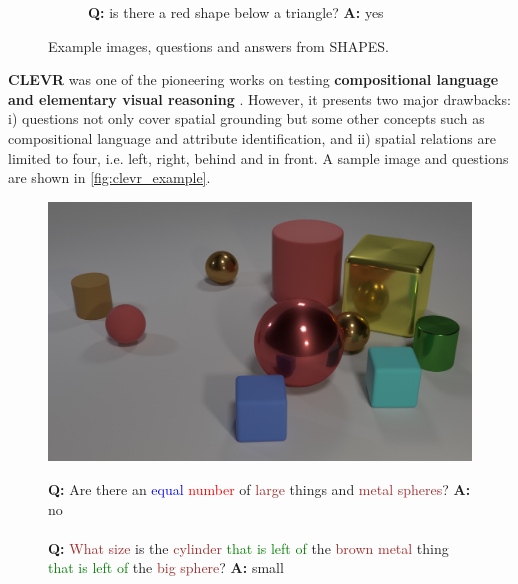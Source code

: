 \begin{figure}[ht]
\begin{subfigure}[b]{0.24\linewidth}
    \caption{\textbf{Q:} is there a red shape below a triangle? \textbf{A:} yes}
     \end{subfigure}
    \caption{Example images, questions and answers from SHAPES.}
    \label{fig:shapes_examples}
\end{figure}

\textbf{CLEVR} was one of the pioneering works on testing \textbf{compositional language and elementary visual reasoning} \cite{johnson2017clevr}. However, it presents two major drawbacks: i) questions not only cover spatial grounding but some other concepts such as compositional language and attribute identification, and ii) spatial relations are limited to four, i.e. left, right, behind and in front. A sample image and questions are shown in \cref{fig:clevr_example}.

\begin{figure}[ht]
  \centering
  \begin{minipage}{0.49\textwidth}
  \includegraphics[width=\textwidth]{images/datasets/clevr_example.jpg}
  \end{minipage}
  \vspace{1mm}
  \begin{minipage}{0.49\textwidth}
    \footnotesize
    \textbf{Q:} Are there an \textcolor{blue}{equal} \textcolor{red}{number} of
    \textcolor{brown}{large} things and \textcolor{brown}{metal spheres}? \textbf{A:} no \\\\
    \textbf{Q:} \textcolor{brown}{What size} is the \textcolor{brown}{cylinder}
    \textcolor{green}{that is left of} the \textcolor{brown}{brown metal} thing
    \textcolor{green}{that is left of} the \textcolor{brown}{big sphere}? \textbf{A:} small \\\\

\end{minipage}
\end{figure}
